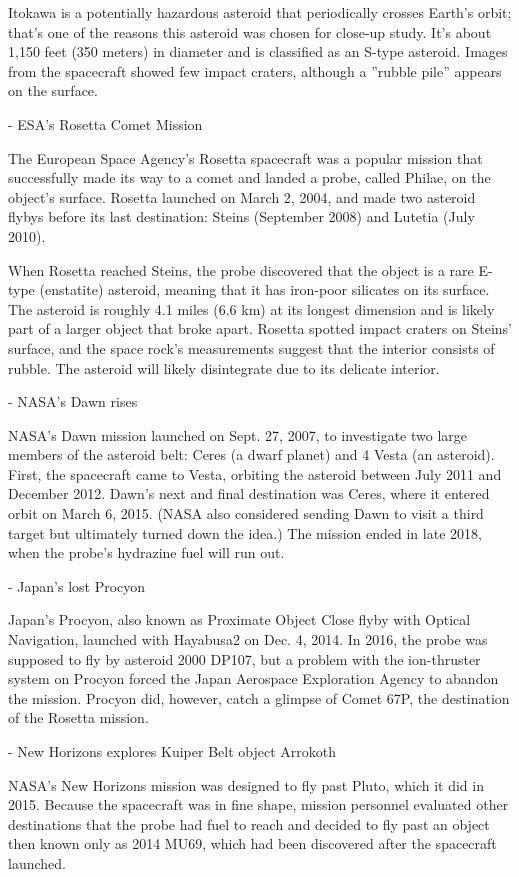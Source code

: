 Itokawa is a potentially hazardous asteroid that periodically crosses Earth's
orbit; that's one of the reasons this asteroid was chosen for close-up study.
It's about 1,150 feet (350 meters) in diameter and is classified as an S-type
asteroid. Images from the spacecraft showed few impact craters, although a
''rubble pile'' appears on the surface.


- ESA's Rosetta Comet Mission

The European Space Agency's Rosetta spacecraft was a popular mission that
successfully made its way to a comet and landed a probe, called Philae, on the
object's surface. Rosetta launched on March 2, 2004, and made two asteroid
flybys before its last destination: Steins (September 2008) and Lutetia (July
2010).

When Rosetta reached Steins, the probe discovered that the object is a rare
E-type (enstatite) asteroid, meaning that it has iron-poor silicates on its
surface. The asteroid is roughly 4.1 miles (6.6 km) at its longest dimension and
is likely part of a larger object that broke apart. Rosetta spotted impact
craters on Steins' surface, and the space rock's measurements suggest that the
interior consists of rubble. The asteroid will likely disintegrate due to its
delicate interior.

- NASA's Dawn rises

NASA's Dawn mission launched on Sept. 27, 2007, to investigate two large members
of the asteroid belt: Ceres (a dwarf planet) and 4 Vesta (an asteroid). First,
the spacecraft came to Vesta, orbiting the asteroid between July 2011 and
December 2012. Dawn's next and final destination was Ceres, where it entered
orbit on March 6, 2015. (NASA also considered sending Dawn to visit a third
target but ultimately turned down the idea.) The mission ended in late 2018,
when the probe's hydrazine fuel will run out.

- Japan's lost Procyon

Japan's Procyon, also known as Proximate Object Close flyby with Optical
Navigation, launched with Hayabusa2 on Dec. 4, 2014. In 2016, the probe was
supposed to fly by asteroid 2000 DP107, but a problem with the ion-thruster
system on Procyon forced the Japan Aerospace Exploration Agency to abandon the
mission. Procyon did, however, catch a glimpse of Comet 67P, the destination of
the Rosetta mission.

- New Horizons explores Kuiper Belt object Arrokoth

NASA's New Horizons mission was designed to fly past Pluto, which it did in
2015. Because the spacecraft was in fine shape, mission personnel evaluated
other destinations that the probe had fuel to reach and decided to fly past an
object then known only as 2014 MU69, which had been discovered after the
spacecraft launched.

